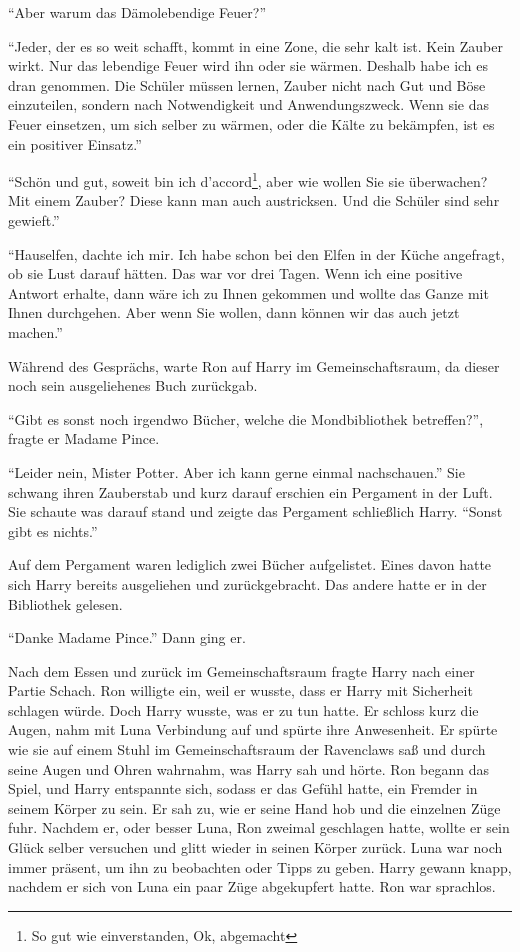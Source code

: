 \enquote{Aber warum das Dämo\aabs lebendige Feuer?}

\enquote{Jeder, der es so weit schafft, kommt in eine Zone, die sehr kalt ist. Kein Zauber wirkt. Nur das lebendige Feuer wird ihn oder sie wärmen. Deshalb habe ich es dran genommen. Die Schüler müssen lernen, Zauber nicht nach Gut und Böse einzuteilen, sondern nach Notwendigkeit und Anwendungszweck. Wenn sie das Feuer einsetzen, um sich selber zu wärmen, oder die Kälte zu bekämpfen, ist es ein positiver Einsatz.}

\enquote{Schön und gut, soweit bin ich d'accord\footnote{So gut wie einverstanden, Ok, abgemacht}, aber wie wollen Sie sie überwachen? Mit einem Zauber? Diese kann man auch austricksen. Und die Schüler sind sehr gewieft.}

\enquote{Hauselfen, dachte ich mir. Ich habe schon bei den Elfen in der Küche angefragt, ob sie Lust darauf hätten. Das war vor drei Tagen. Wenn ich eine positive Antwort erhalte, dann wäre ich zu Ihnen gekommen und wollte das Ganze mit Ihnen durchgehen. Aber wenn Sie wollen, dann können wir das auch jetzt machen.}

Während des Gesprächs, warte Ron auf Harry im Gemeinschaftsraum, da dieser noch sein ausgeliehenes Buch zurückgab.

\enquote{Gibt es sonst noch irgendwo Bücher, welche die Mondbibliothek betreffen?}, fragte er Madame Pince.

\enquote{Leider nein, Mister Potter. Aber ich kann gerne einmal nachschauen.} Sie schwang ihren Zauberstab und kurz darauf erschien ein Pergament in der Luft. Sie schaute was darauf stand und zeigte das Pergament schließlich Harry. \enquote{Sonst gibt es nichts.}

Auf dem Pergament waren lediglich zwei Bücher aufgelistet. Eines davon hatte sich Harry bereits ausgeliehen und zurückgebracht. Das andere hatte er in der Bibliothek gelesen.

\enquote{Danke Madame Pince.} Dann ging er.

Nach dem Essen und zurück im Gemeinschaftsraum fragte Harry nach einer Partie Schach. Ron willigte ein, weil er wusste, dass er Harry mit Sicherheit schlagen würde. Doch Harry wusste, was er zu tun hatte. Er schloss kurz die Augen, nahm mit Luna Verbindung auf und spürte ihre Anwesenheit. Er spürte wie sie auf einem Stuhl im Gemeinschaftsraum der Ravenclaws saß und durch seine Augen und Ohren wahrnahm, was Harry sah und hörte. Ron begann das Spiel, und Harry entspannte sich, sodass er das Gefühl hatte, ein Fremder in seinem Körper zu sein. Er sah zu, wie er seine Hand hob und die einzelnen Züge fuhr. Nachdem er, oder besser Luna, Ron zweimal geschlagen hatte, wollte er sein Glück selber versuchen und glitt wieder in seinen Körper zurück. Luna war noch immer präsent, um ihn zu beobachten oder Tipps zu geben. Harry gewann knapp, nachdem er sich von Luna ein paar Züge abgekupfert hatte. Ron war sprachlos.

